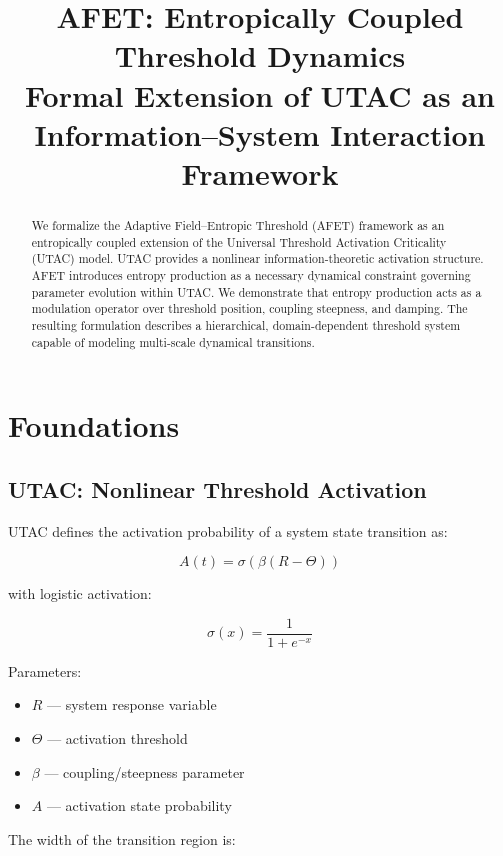 \documentclass[12pt]{article}
\title{AFET: Entropically Coupled Threshold Dynamics \\
Formal Extension of UTAC as an Information–System Interaction Framework}
\author{}
\date{}
\begin{document}
\maketitle

\begin{abstract}
We formalize the Adaptive Field–Entropic Threshold (AFET) framework as an entropically coupled extension of the Universal Threshold Activation Criticality (UTAC) model. 
UTAC provides a nonlinear information-theoretic activation structure. AFET introduces entropy production as a necessary dynamical constraint governing parameter evolution within UTAC. 
We demonstrate that entropy production acts as a modulation operator over threshold position, coupling steepness, and damping. 
The resulting formulation describes a hierarchical, domain-dependent threshold system capable of modeling multi-scale dynamical transitions.
\end{abstract}

\section{Foundations}

\subsection{UTAC: Nonlinear Threshold Activation}

UTAC defines the activation probability of a system state transition as:

\begin{equation}
A(t) = \sigma\left( \beta (R - \Theta) \right)
\end{equation}

with logistic activation:

\begin{equation}
\sigma(x) = \frac{1}{1 + e^{-x}}
\end{equation}

Parameters:

\begin{itemize}
\item $R$ — system response variable
\item $\Theta$ — activation threshold
\item $\beta$ — coupling/steepness parameter
\item $A$ — activation state probability
\end{itemize}

The width of the transition region is:
\end{document}
